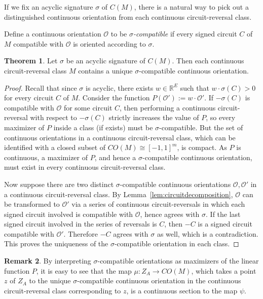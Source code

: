\documentclass[12pt]{amsart}
\numberwithin{equation}{section}
\theoremstyle{definition}
\newtheorem{theorem}{Theorem}[subsection]
\newtheorem{remark}[theorem]{Remark}
\begin{document}
If we fix an acyclic signature $\sigma$ of $C(M)$, there is a natural way to pick out a distinguished continuous orientation from each continuous circuit-reversal class.

Define a continuous orientation ${\mathcal O}$ to be {\em $\sigma$-compatible} if every signed circuit $C$ of $M$ compatible with ${\mathcal O}$ is oriented according to $\sigma$.  

\medskip

\begin{theorem} \label{thm:continuouscompatible}
Let $\sigma$ be an acyclic signature of $C(M)$. Then each continuous circuit-reversal class $M$ contains a unique $\sigma$-compatible continuous orientation.
\end{theorem}

\begin{proof} Recall that since $\sigma$ is acyclic, there exists $w\in\mathbb{R}^E$ such that $w\cdot\sigma(C)>0$ for every circuit $C$ of $M$. Consider the function $P(\mathcal{O}'):=w\cdot\mathcal{O}'$. If $-\sigma(C)$ is compatible with $\mathcal{O}$ for some circuit $C$, then performing a continuous circuit-reversal with respect to $-\sigma(C)$ strictly increases the value of $P$, so every maximizer of $P$ inside a class (if exists) must be $\sigma$-compatible. But the set of continuous orientations in a continuous circuit-reversal class, which can be identified with a closed subset of $CO(M)\cong[-1,1]^m$, is compact. 
As $P$ is continuous, a maximizer of $P$, and hence a $\sigma$-compatible continuous orientation, must exist in every continuous circuit-reversal class.

Now suppose there are two distinct $\sigma$-compatible continuous orientations $\mathcal{O},\mathcal{O}'$ in a continuous circuit-reversal class. By Lemma~\ref{lem:circuitdecomposition}, $\mathcal{O}$ can be transformed to $\mathcal{O}'$ via a series of continuous circuit-reversals in which each signed circuit involved is compatible with $\mathcal{O}$, hence agrees with $\sigma$. If the last signed circuit involved in the series of reversals is $C$, then $-C$ is a signed circuit compatible with $\mathcal{O}'$. Therefore $-C$ agrees with $\sigma$ as well, which is a contradiction.
This proves the uniqueness of the $\sigma$-compatible orientation in each class.
\end{proof}

\begin{remark}
By interpreting $\sigma$-compatible orientations as maximizers of the linear function $P$, it is easy to see that the map $\mu:Z_A\rightarrow CO(M)$, which takes a point $z$ of $Z_A$ to the unique $\sigma$-compatible continuous orientation in the continuous circuit-reversal class corresponding to $z$, is a continuous section to the map $\psi$.
\end{remark}
\end{document}
